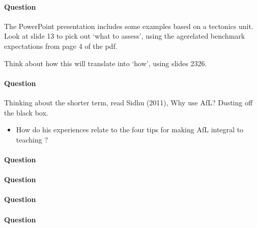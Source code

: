 \documentclass[letterpaper,10pt,english]{sphinxmanual}
\begin{document}
\paragraph{Question}
\label{\detokenize{content/session_00/Part_00_02:id4}}\label{\detokenize{content/session_00/Part_00_02:id5}}
The PowerPoint presentation includes some examples based on a tectonics unit. Look at slide 13 to pick out ‘what to assess’, using the age\sphinxhyphen{}related benchmark expectations from page 4 of the pdf.

Think about how this will translate into ‘how’, using slides 23\textendash{}26.


\paragraph{Question}
\label{\detokenize{content/session_00/Part_00_02:id6}}\label{\detokenize{content/session_00/Part_00_02:id7}}
Thinking about the shorter term, read Sidhu (2011), Why use AfL? Dusting off the black box.
\begin{itemize}
\item {} 
How do his experiences relate to the four tips for making AfL integral to teaching ?

\end{itemize}


\paragraph{Question}
\label{\detokenize{content/session_00/Part_00_02:id8}}


\paragraph{Question}
\label{\detokenize{content/session_00/Part_00_02:id9}}


\paragraph{Question}
\label{\detokenize{content/session_00/Part_00_02:id10}}\label{\detokenize{content/session_00/Part_00_02:id11}}


\paragraph{Question}
\label{\detokenize{content/session_00/Part_00_02:id12}}
\end{document}
